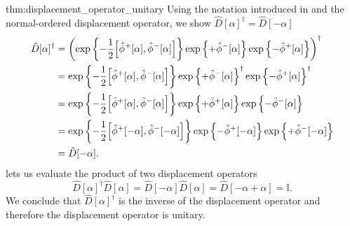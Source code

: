 \begin{delayedproof}{thm:displacement_operator_unitary}
	Using the notation introduced in  and the normal-ordered displacement operator, we show $\hat{D}[\alpha]^\dagger=\hat{D}[-\alpha]$
	\begin{equation*}
		\begin{split}
			\hat{D}[\alpha]^\dagger
			&=
			\left(
				\exp\left\{
					-
					\frac{1}{2}
					\comm{\hat\phi^+[\alpha]}{\hat\phi^-[\alpha]}
				\right\}
				\exp\left\{
					+
					\hat\phi^-[\alpha]
				\right\}
				\exp\left\{
					-
					\hat\phi^+[\alpha]
				\right\}
			\right)^\dagger
			\\
			&=
			\exp\left\{
				-
				\frac{1}{2}
				\comm{\hat\phi^+[\alpha]}{\hat\phi^-[\alpha]}
			\right\}
			\exp\left\{
				+
				\hat\phi^-[\alpha]
			\right\}^\dagger
			\exp\left\{
				-
				\hat\phi^+[\alpha]
			\right\}^\dagger
			\\
			&=
			\exp\left\{
				-
				\frac{1}{2}
				\comm{\hat\phi^+[\alpha]}{\hat\phi^-[\alpha]}
			\right\}
			\exp\left\{
				+
				\hat\phi^+[\alpha]
			\right\}
			\exp\left\{
				-
				\hat\phi^-[\alpha]
			\right\}
			\\
			&=
			\exp\left\{
				-
				\frac{1}{2}
				\comm{\hat\phi^+[-\alpha]}{\hat\phi^-[-\alpha]}
			\right\}
			\exp\left\{
				-
				\hat\phi^+[-\alpha]
			\right\}
			\exp\left\{
				+
				\hat\phi^-[-\alpha]
			\right\}
			\\
			&=
			\hat{D}[-\alpha]
			.
		\end{split}
	\end{equation*}
	 lets us evaluate the product of two displacement operators
	\begin{equation*}
		\hat{D}[\alpha]^\dagger
		\hat{D}[\alpha]
		=
		\hat{D}[-\alpha]
		\hat{D}[\alpha]
		=
		\hat{D}[-\alpha+\alpha]
		=
		\mathbb{I}
		.
	\end{equation*}
	We conclude that $\hat{D}[\alpha]^\dagger$ is the inverse of the displacement operator and therefore the displacement operator is unitary.
\end{delayedproof}
